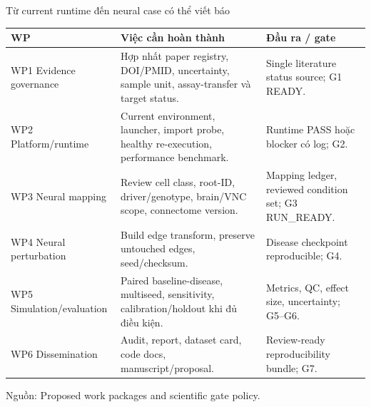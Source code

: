 \documentclass[10pt,aspectratio=169]{beamer}
\newcommand{\source}[1]{\par\vfill{\fontsize{6.0}{7}\selectfont\color{gray}Nguồn: #1\par}}
\begin{document}
\begin{frame}{Từ current runtime đến neural case có thể viết báo}
\renewcommand{\arraystretch}{1.18}\scriptsize
\begin{tabular}{@{}L{2.4cm}L{7.5cm}L{4.6cm}@{}}
\toprule
\textbf{WP} & \textbf{Việc cần hoàn thành} & \textbf{Đầu ra / gate}\\\midrule
WP1 Evidence governance & Hợp nhất paper registry, DOI/PMID, uncertainty, sample unit, assay-transfer và target status. & Single literature status source; G1 READY.\\
WP2 Platform/runtime & Current environment, launcher, import probe, healthy re-execution, performance benchmark. & Runtime PASS hoặc blocker có log; G2.\\
WP3 Neural mapping & Review cell class, root-ID, driver/genotype, brain/VNC scope, connectome version. & Mapping ledger, reviewed condition set; G3 RUN\_READY.\\
WP4 Neural perturbation & Build edge transform, preserve untouched edges, seed/checksum. & Disease checkpoint reproducible; G4.\\
WP5 Simulation/evaluation & Paired baseline-disease, multiseed, sensitivity, calibration/holdout khi đủ điều kiện. & Metrics, QC, effect size, uncertainty; G5--G6.\\
WP6 Dissemination & Audit, report, dataset card, code docs, manuscript/proposal. & Review-ready reproducibility bundle; G7.\\\bottomrule
\end{tabular}
\source{Proposed work packages and scientific gate policy.}
\end{frame}
\end{document}
